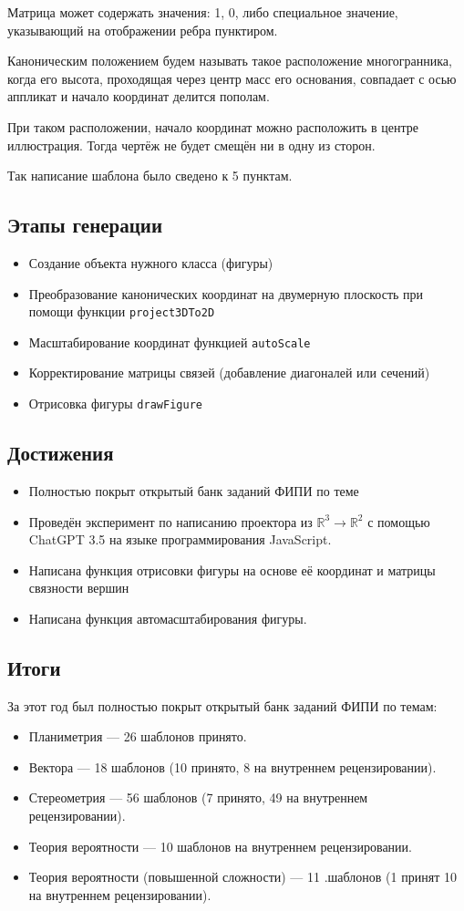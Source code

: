 \documentclass[a4paper, 12pt]{extarticle}
\begin{document}
Матрица может содержать значения: 1, 0, либо специальное значение, указывающий на отображении ребра пунктиром.

Каноническим положением будем называть такое расположение многогранника, когда его высота, проходящая через центр масс его основания, совпадает с осью аппликат и начало координат делится пополам.

При таком расположении, начало координат можно расположить в центре иллюстрация. Тогда чертёж не будет смещён ни в одну из сторон.

Так написание шаблона было сведено к 5 пунктам.

\subsection*{Этапы генерации}
\begin{itemize}
	\item Создание объекта нужного класса (фигуры)
	\item Преобразование канонических координат на двумерную плоскость при помощи функции \texttt{project3DTo2D}
	\item Масштабирование координат функцией \texttt{autoScale}
	\item Корректирование матрицы связей (добавление диагоналей или сечений)
	\item Отрисовка фигуры \texttt{drawFigure}
\end{itemize}

\subsection*{Достижения}
\begin{itemize}
	\item Полностью покрыт открытый банк заданий ФИПИ по теме
	\item Проведён эксперимент по написанию проектора из $\mathbb{R}^3 \to \mathbb{R}^2$ с помощью ChatGPT 3.5 на языке программирования JavaScript.
	\item Написана функция отрисовки фигуры на основе её координат и матрицы связности вершин
	\item Написана функция автомасштабирования фигуры.
\end{itemize}

\subsection*{Итоги}
За этот год был полностью покрыт открытый банк заданий ФИПИ по темам:
\begin{itemize}
	\item Планиметрия — 26 шаблонов принято.
	\item Вектора — 18 шаблонов (10 принято, 8 на внутреннем рецензировании).
	\item Стереометрия — 56 шаблонов (7 принято, 49 на внутреннем рецензировании).
	\item Теория вероятности — 10 шаблонов на внутреннем рецензировании.
	\item Теория вероятности (повышенной сложности) — 11 .шаблонов (1 принят 10 на внутреннем рецензировании).
\end{itemize}
\end{document}
